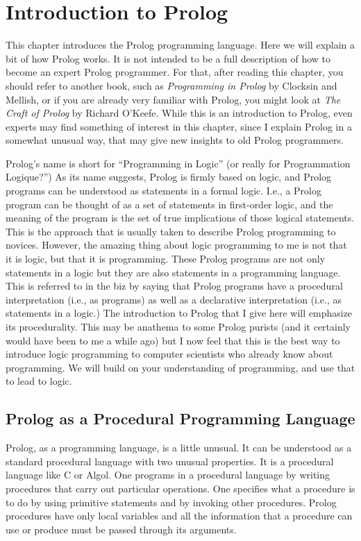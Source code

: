 \chapter{Introduction to Prolog} \label{introduction}

This chapter introduces the Prolog programming language.  Here we will
explain a bit of how Prolog works.  It is not intended to be a full
description of how to become an expert Prolog programmer.  For that,
after reading this chapter, you should refer to another book, such as
{\em Programming in Prolog} by Clocksin and Mellish, or if you are
already very familiar with Prolog, you might look at {\em The Craft of
Prolog} by Richard O'Keefe.  While this is an introduction to Prolog,
even experts may find something of interest in this chapter, since I
explain Prolog in a somewhat unusual way, that may give new insights
to old Prolog programmers.

Prolog's name is short for ``Programming in Logic'' (or really for
Programmation Logique?'')  As its name suggests, Prolog is firmly
based on logic, and Prolog programs can be understood as statements in
a formal logic.  I.e., a Prolog program can be thought of as a set of
statements in first-order logic, and the meaning of the program is the
set of true implications of those logical statements.  This is the
approach that is usually taken to describe Prolog programming to
novices.  However, the amazing thing about logic programming to me is
not that it is logic, but that it is programming.  These Prolog
programs are not only statements in a logic but they are also
statements in a programming language.  This is referred to in the biz
by saying that Prolog programs have a procedural interpretation (i.e.,
as programs) as well as a declarative interpretation (i.e., as
statements in a logic.)  The introduction to Prolog that I give here
will emphasize its procedurality.  This may be anathema to some Prolog
purists (and it certainly would have been to me a while ago) but I now
feel that this is the best way to introduce logic programming to
computer scientists who already know about programming.  We will build
on your understanding of programming, and use that to lead to logic.

\section{Prolog as a Procedural Programming Language}

Prolog, as a programming language, is a little unusual.  It can be
understood as a standard procedural language with two unusual
properties.  It is a procedural language like C or Algol.  One
programs in a procedural language by writing procedures that carry out
particular operations.  One specifies what a procedure is to do by
using primitive statements and by invoking other procedures.  Prolog
procedures have only local variables and all the information that a
procedure can use or produce must be passed through its arguments.

